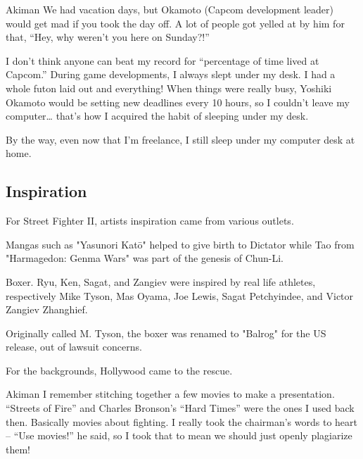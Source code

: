 \begin{q}{Akiman\cite{akiman2003}}
  We had vacation days, but Okamoto (Capcom development leader) would get mad if you took the day off. A lot of people got yelled at by him for that, “Hey, why weren’t you here on Sunday?!”

  I don’t think anyone can beat my record for “percentage of time lived at Capcom.” During game developments, I always slept under my desk. I had a whole futon laid out and everything! When things were really busy, Yoshiki Okamoto  would be setting new deadlines every 10 hours, so I couldn’t leave my computer… that’s how I acquired the habit of sleeping under my desk. 

  By the way, even now that I’m freelance, I still sleep under my computer desk at home.
  \end{q}











\subsection{Inspiration}
For Street Fighter II, artists inspiration came from various outlets. 

Mangas such as "Yasunori Katō" helped to give birth to Dictator while Tao from "Harmagedon: Genma Wars" was part of the genesis of Chun-Li. 

Boxer. Ryu, Ken, Sagat, and Zangiev were inspired by real life athletes, respectively Mike Tyson, Mas Oyama, Joe Lewis, Sagat Petchyindee, and Victor Zangiev Zhanghief.

\begin{trivia}
Originally called M. Tyson, the boxer was renamed to "Balrog" for the US release, out of lawsuit concerns. 
\end{trivia}


For the backgrounds, Hollywood came to the rescue.

\begin{q}{Akiman\cite{ffdevinterview}}
I remember stitching together a few movies to make a presentation. “Streets of Fire” and Charles Bronson’s “Hard Times” were the ones I used back then. Basically movies about fighting. I really took the chairman’s words to heart – “Use movies!” he said, so I took that to mean we should just openly plagiarize them!
\end{q}

